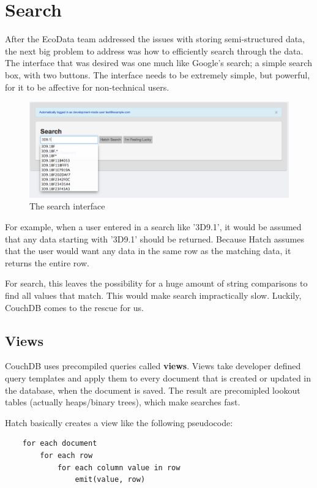 \section{Search}
After the EcoData team addressed the issues with storing semi-structured data, the next 
big problem to address was how to efficiently search through the data. The interface 
that was desired was one much like Google's search; a simple search box, with two
buttons. The interface needs to be extremely simple, but powerful, for it to be 
affective for non-technical users. 

\begin{figure}[h]
	\begin{center}
	\includegraphics[width=120mm]{images/search_ss1}
	\caption{The search interface} 
	\label{search_ss1}
	\end{center}
\end{figure}

For example, when a user entered in a search like '3D9.1', it would be assumed that 
any data starting with '3D9.1' should be returned. Because Hatch assumes that
the user would want any data in the same row as the matching data, it returns
the entire row. 

For search, this leaves the possibility for a huge amount of string comparisons to find
all values that match. This would make search impractically slow. Luckily, CouchDB comes
to the rescue for us.


\subsection{Views}
CouchDB uses precompiled queries called \textbf{views}. Views take developer defined
query templates and apply them to every document that is created or updated in the 
database, when the document is saved. The result are precomipled lookout tables 
(actually heaps/binary trees), which make searches fast. 

Hatch basically creates a view like the following pseudocode:
\begin{lstlisting}
	for each document
		for each row
			for each column value in row
				emit(value, row)
\end{lstlisting}

